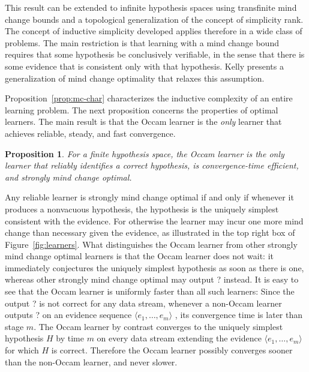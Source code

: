 \documentclass{elsarticle}%
\newtheorem{proposition}[theorem]{Proposition}
\newenvironment{proof-outline}[1][Proof Outline]{\noindent\textbf{#1.} }{\ \rule{0.5em}{0.5em}}
\newcommand{\hypothesis}{H}
\begin{document}
This result can be extended to infinite hypothesis spaces using transfinite mind change bounds and a topological generalization of the concept of simplicity rank. The concept of inductive simplicity developed applies therefore in a wide class of problems. The main restriction is that learning with a mind change bound requires that some hypothesis be conclusively verifiable, in the sense that there is some evidence that is consistent only with that hypothesis. Kelly \cite{Kelly2010} presents a generalization of mind change optimality that relaxes this assumption. 

Proposition~\ref{prop:mc-char} characterizes the inductive complexity of an entire learning problem. The next proposition concerns the properties of optimal learners. The main result is that the Occam learner is the {\em only} learner that achieves reliable, steady, and fast convergence.

\begin{proposition}
\label{prop:occam}
For a finite hypothesis space, the Occam learner is the only learner that reliably identifies a correct hypothesis, is convergence-time efficient, and strongly mind change optimal.
\end{proposition}

\begin{proof-outline}
Any reliable learner is strongly mind change optimal if and only if whenever it produces a nonvacuous hypothesis, the hypothesis is the uniquely simplest consistent with the evidence. For otherwise the learner may incur one more mind change than necessary given the evidence, as illustrated in the top right box of Figure~\ref{fig:learners}. What distinguishes the Occam learner from other strongly mind change optimal learners is that the Occam learner does not wait: it immediately conjectures the  uniquely simplest hypothesis as soon as there is one, whereas other strongly mind change optimal may output ? instead. It is easy to see that the Occam learner is uniformly faster than all such learners: Since the output ? is not correct for any data stream, whenever a non-Occam learner outputs ? on an evidence sequence $\langle e_{1},\ldots,e_{m}\rangle$ , its convergence time is later than stage $m$. The Occam learner by contrast converges to the uniquely simplest hypothesis $\hypothesis$ by time $m$ on every data stream extending the evidence  $\langle e_{1},\ldots,e_{m}\rangle$ for which $\hypothesis$ is correct. Therefore the Occam learner possibly converges sooner than the non-Occam learner, and never slower. 
\end{proof-outline}
\end{document}

